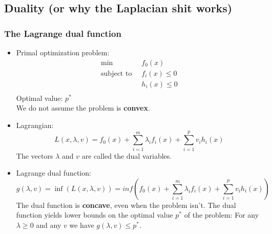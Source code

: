 \documentclass{scrartcl}
\begin{document}
\subsection{Duality (or why the Laplacian shit works)}
\subsubsection{The Lagrange dual function}
\begin{itemize}
    \item
        Primal optimization problem:
        \begin{align*}
            \min\; \; & f_0(x)\\
						\text{subject to} \; \; & f_i(x) \leq 0 \\ %
            & h_i(x) \leq 0 \\
        \end{align*}
        Optimal value: $p^*$\\
        We do not assume the problem is \textbf{convex}.
    \item
        Lagrangian:
        $$ L(x, \lambda, v) = f_0(x) + \sum_{i=1}^{m} \lambda_i f_i(x) + \sum_{i=1}^{p} v_i h_i(x)$$
        The vectors $\lambda$ and $v$ are called the dual variables.
    \item
        Lagrange dual function:
        $$ g(\lambda, v) = \inf(L(x, \lambda, v)) = inf(f_0(x) + \sum_{i=1}^{m} \lambda_i f_i(x) + \sum_{i=1}^{p} v_i h_i(x))$$
        The dual function is \textbf{concave}, even when the problem isn't.
        The dual function yields lower bounds on the optimal value $p^*$ of the problem: For any $\lambda \geq 0$ and any $v$ we have $g(\lambda, v) \leq p^*$.
\end{itemize}
\end{document}
